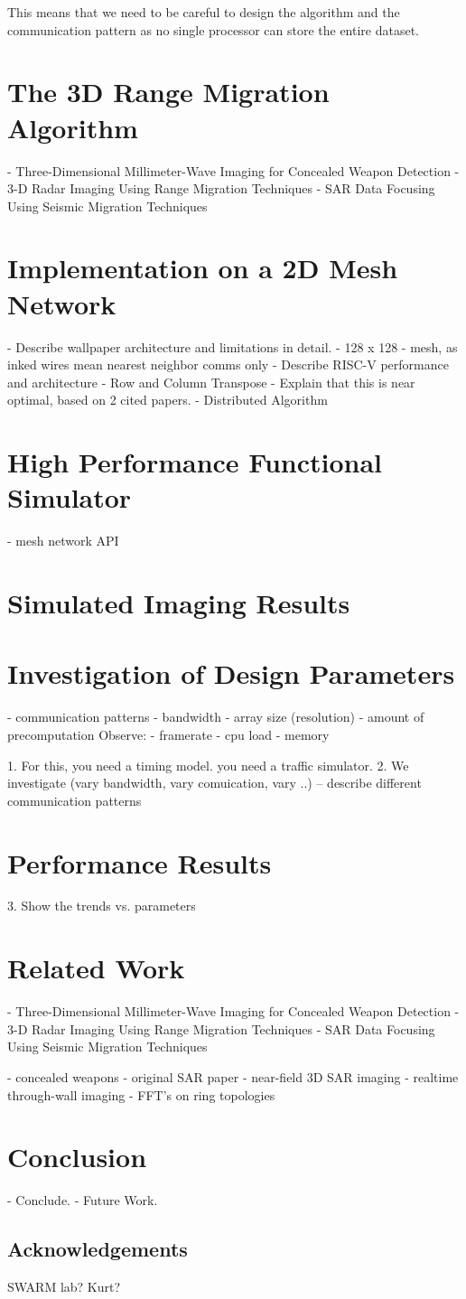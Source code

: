 This means that we need to be careful to design the algorithm and the communication pattern as no single processor can store the entire dataset.


\section{The 3D Range Migration Algorithm}
- Three-Dimensional Millimeter-Wave Imaging for Concealed Weapon Detection
- 3-D Radar Imaging Using Range Migration Techniques
- SAR Data Focusing Using Seismic Migration Techniques

\section{Implementation on a 2D Mesh Network}
- Describe wallpaper architecture and limitations in detail.
  - 128 x 128
  - mesh, as inked wires mean nearest neighbor comms only
  - Describe RISC-V performance and architecture
- Row and Column Transpose
- Explain that this is near optimal, based on 2 cited papers.
- Distributed Algorithm

\section{High Performance Functional Simulator}
- mesh network API

\section{Simulated Imaging Results}

\section{Investigation of Design Parameters}
- communication patterns
- bandwidth
- array size (resolution)
- amount of precomputation
Observe:
- framerate
- cpu load
- memory

1. For this, you need a timing model. you need a traffic simulator.
2. We investigate (vary bandwidth, vary comuication, vary ..)
-- describe different communication patterns

\section{Performance Results}
3. Show the trends vs. parameters

\section{Related Work}
- Three-Dimensional Millimeter-Wave Imaging for Concealed Weapon Detection
- 3-D Radar Imaging Using Range Migration Techniques
- SAR Data Focusing Using Seismic Migration Techniques

- concealed weapons
- original SAR paper
- near-field 3D SAR imaging
- realtime through-wall imaging
- FFT's on ring topologies

\section{Conclusion}
- Conclude.
- Future Work.

\subsection*{Acknowledgements}
SWARM lab?
Kurt?


{\small


}


